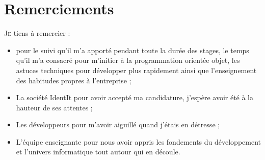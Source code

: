\chapter*{Remerciements} %
\label{cha:Remerciements}

\lettrine{J}{e} tiens à remercier :
\begin{itemize}
    \item {} pour le suivi qu'il m'a apporté pendant toute la
    durée des stages, le temps qu'il m'a consacré pour m'initier à la
    programmation orientée objet, les astuces techniques pour développer
    plus rapidement ainsi que l'enseignement des habitudes propres à
    l'entreprise ;
    \item La société IdentIt pour avoir accepté ma candidature, j'espère avoir
    été à la hauteur de ses attentes ;
    \item Les développeurs pour m'avoir aiguillé quand j'étais en détresse ;
    \item L'équipe enseignante pour nous avoir appris les fondements du
    développement et l'univers informatique tout autour qui en découle.
\end{itemize}
